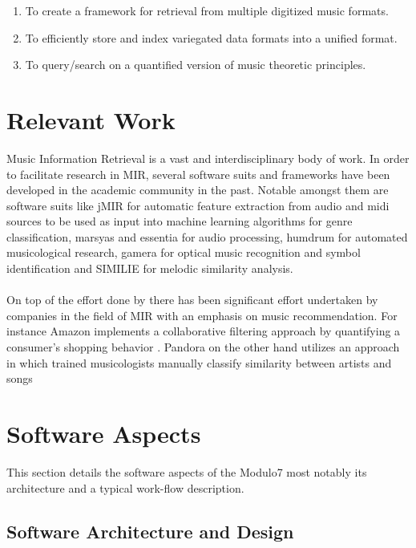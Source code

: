 \documentclass{article}
\begin{document}
\begin{enumerate}
\item To create a framework for retrieval from multiple digitized music formats. 
\item To efficiently store and index variegated data formats into a unified format.  
\item To query/search on a quantified version of music theoretic principles. 
\end{enumerate}

%
\section{Relevant Work} \label{sec:relevantwork}

Music Information Retrieval is a vast and interdisciplinary body of work. In order to facilitate research in MIR, several software suits and frameworks have been developed in the academic community in the past. Notable amongst them are software suits like jMIR \cite{jMIR} for automatic feature extraction from audio and midi sources to be used as input into machine learning algorithms for genre classification, marsyas \cite{marsyas} and essentia \cite{essentia} for audio processing, humdrum \cite{humdrum} for automated musicological research, gamera \cite{gamera} for optical music recognition and symbol identification and SIMILIE \cite{similie} for melodic similarity analysis. \\\\
On top of the effort done by there has been significant effort undertaken by companies in the field of MIR with an emphasis on music recommendation. For instance Amazon implements a collaborative filtering approach by quantifying a consumer's shopping behavior \cite{amazonreco}. Pandora on the other hand utilizes an approach in which trained musicologists manually classify similarity between artists and songs \cite{pa}
\section{Software Aspects}\label{sec:architecture}

This section details the software aspects of the Modulo7 most notably its architecture and a typical work-flow description. 

\subsection{Software Architecture and Design}
\end{document}
